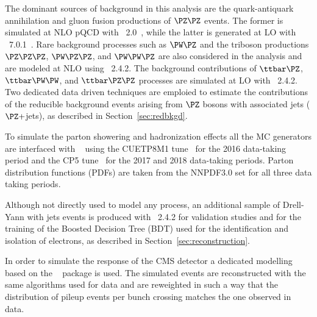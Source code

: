 { The dominant sources of background in this analysis are the quark-antiquark annihilation and gluon fusion productions of $\PZ\PZ$ events. The former is simulated at NLO pQCD with \POWHEG~2.0~\cite{Melia:2011tj}, while the latter is generated at LO with \MCFM~7.0.1~\cite{MCFM}.
Rare background processes such as $\PW\PZ$ and the triboson productions $\PZ\PZ\PZ$, $\PW\PZ\PZ$, and $\PW\PW\PZ$ are also considered in the analysis and are modeled at NLO using \MGvATNLO~2.4.2.
The background contributions of $\ttZ$, $\ttWW$, and $\ttZZ$ processes are simulated at LO with \MGvATNLO~2.4.2.
Two dedicated data driven techniques are emploied to estimate the contributions of the reducible background events arising from $\PZ$ bosons with associated jets ($\PZ+$jets),  as described in Section~\ref{sec:redbkgd}.\par}

To simulate the parton showering and hadronization effects all the MC generators are interfaced with ~\cite{Sjostrand:2014zea} using the CUETP8M1 tune~\cite{Khachatryan:2015pea} for the 2016 data-taking period and the CP5 tune~\cite{Sirunyan:2019dfx} for the 2017 and 2018 data-taking periods. Parton distribution functions (PDFs) are taken from the NNPDF3.0 set \cite{Ball:2014uwa} for all three data taking periods.

Although not directly used to model any process, an additional sample of Drell-Yann with jets events is produced with \MGvATNLO~2.4.2 for validation studies and for the training of the Boosted Decision Tree (BDT) used for the identification and isolation of electrons, as described in Section~\ref{sec:reconstruction}.

In order to simulate the response of the CMS detector a dedicated modelling based on the \GEANTfour~\cite{Agostinelli:2002hh,GEANT} package is used. The simulated events are reconstructed with the same algorithms used for data and are reweighted in such a way that the distribution of pileup events per bunch crossing matches the one observed in data.

